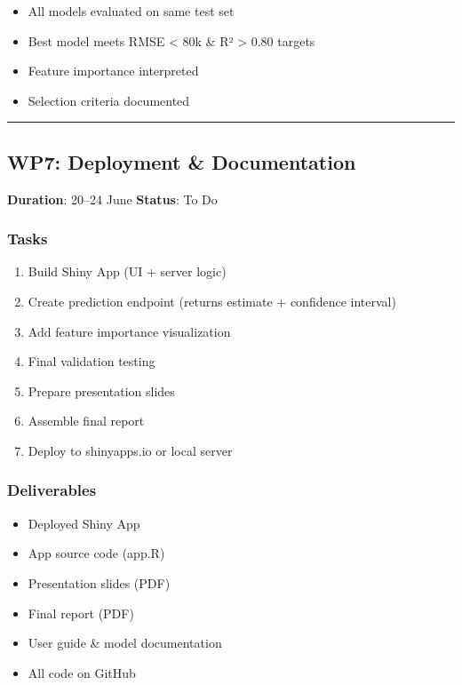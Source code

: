 \documentclass[
  english,
  letterpaper,
  DIV=11,
  numbers=noendperiod]{scrreprt}
\providecommand{\tightlist}{%
  \setlength{\itemsep}{0pt}\setlength{\parskip}{0pt}}
\begin{document}
\begin{itemize}
\tightlist
\item[$\square$]
  All models evaluated on same test set
\item[$\square$]
  Best model meets RMSE \textless{} 80k \& R² \textgreater{} 0.80
  targets
\item[$\square$]
  Feature importance interpreted
\item[$\square$]
  Selection criteria documented
\end{itemize}

\begin{center}\rule{0.5\linewidth}{0.5pt}\end{center}

\subsection{WP7: Deployment \&
Documentation}\label{wp7-deployment-documentation}

\textbf{Duration}: 20--24 June \textbar{} \textbf{Status}: To Do

\subsubsection{Tasks}\label{tasks-5}

\begin{enumerate}
\def\labelenumi{\arabic{enumi}.}
\tightlist
\item
  Build Shiny App (UI + server logic)
\item
  Create prediction endpoint (returns estimate + confidence interval)
\item
  Add feature importance visualization
\item
  Final validation testing
\item
  Prepare presentation slides
\item
  Assemble final report
\item
  Deploy to shinyapps.io or local server
\end{enumerate}

\subsubsection{Deliverables}\label{deliverables-7}

\begin{itemize}
\tightlist
\item
  Deployed Shiny App
\item
  App source code (app.R)
\item
  Presentation slides (PDF)
\item
  Final report (PDF)
\item
  User guide \& model documentation
\item
  All code on GitHub
\end{itemize}
\end{document}
